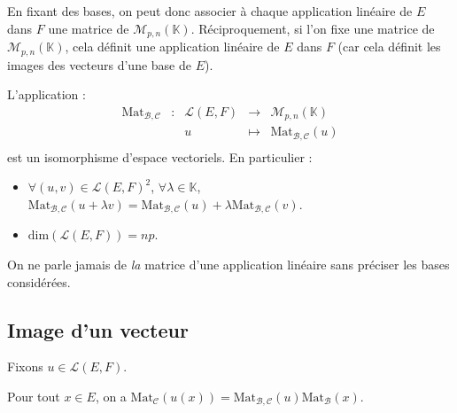 \documentclass[a4paper,10pt]{report}
\begin{document}
En fixant des bases, on peut donc associer à chaque application linéaire de $E$ dans $F$ une matrice de $\mathcal{M}_{p,n}(\mathbb{K})$. Réciproquement, si l'on fixe une matrice de $\mathcal{M}_{p,n}(\mathbb{K})$, cela définit une application linéaire de $E$ dans $F$ (car cela définit les images des vecteurs d'une base de $E$).

\begin{Theoreme}{} L'application :
$$ \begin{array}{ccccl}
\textrm{Mat}_{\mathcal{B}, \mathcal{C}} & : & \mathcal{L}(E,F) & \rightarrow & \mathcal{M}_{p,n}(\mathbb{K}) \\
& & u & \mapsto & \textrm{Mat}_{\mathcal{B}, \mathcal{C}}(u) \\
\end{array}$$
est un isomorphisme d'espace vectoriels. En particulier :

\begin{itemize}
\item $\forall (u,v) \in \mathcal{L}(E,F)^2$, $\forall \lambda \in \mathbb{K}$, $\textrm{Mat}_{\mathcal{B}, \mathcal{C}}(u + \lambda v) = \textrm{Mat}_{\mathcal{B}, \mathcal{C}}(u) + \lambda \textrm{Mat}_{\mathcal{B}, \mathcal{C}}(v)$.
\item $\textrm{dim}(\mathcal{L}(E,F)) = np$.
\end{itemize}
\end{Theoreme}

\begin{att} On ne parle jamais de \emph{la} matrice d'une application linéaire sans préciser les bases considérées.
\end{att}

\subsection{Image d'un vecteur}
Fixons $u \in \mathcal{L}(E,F)$.

\begin{Proposition}{} Pour tout $x \in E$, on a $\textrm{Mat}_{\mathcal{C}}(u(x)) = \textrm{Mat}_{\mathcal{B}, \mathcal{C}}(u) \textrm{Mat}_{\mathcal{B}}(x)$.
\end{Proposition}
\end{document}
